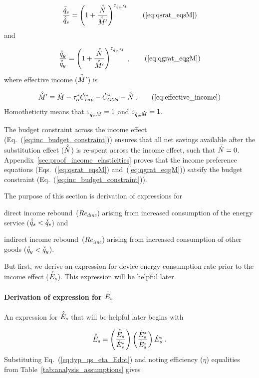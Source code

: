 \begin{equation}
  \incprefseqn \tag{\ref{eq:qsrat_eqsM}}
\end{equation}
%
and

\begin{equation}
  \incprefoeqn \; , \tag{\ref{eq:qgrat_eqgM}}
\end{equation}
%
where effective income ($\hat{\dot{M}}^\prime$) is

\begin{equation}
  \effinceqn{} \; . \tag{\ref{eq:effective_income}}
\end{equation}
%
Homotheticity means that $\varepsilon_{\dot{q}_s\!,\dot{M}} = 1$ and $\varepsilon_{\dot{q}_g\!,\dot{M}} = 1$.

The budget constraint across the income effect (Eq.~(\ref{eq:inc_budget_constraint}))
ensures that all net savings available after the substitution effect ($\hat{\dot{N}}$)
is re-spent across the income effect,
such that $\bar{\dot{N}} = 0$.
Appendix~\ref{sec:proof_income_elasticities} proves that
the income preference equations (Eqs.~(\ref{eq:qsrat_eqsM}) and~(\ref{eq:qgrat_eqgM}))
satsify the budget constraint (Eq.~(\ref{eq:inc_budget_constraint})).

The purpose of this section is derivation of expressions for
%
\begin{enumerate*}[label={(\roman*)}]

  \item direct income rebound~($Re_{dinc}$)
        arising from increased consumption of the energy service
        ($\hat{\dot{q}}_s < \bar{\dot{q}}_s$) and

  \item indirect income rebound~($Re_{iinc}$)
        arising from increased consumption of other goods
        ($\hat{\dot{q}}_g < \bar{\dot{q}}_g$).

\end{enumerate*}

But first, we derive an expression
for device energy consumption rate prior to the income effect
($\hat{\dot{E}}_s$).
This expression will be helpful later.

\paragraph{Derivation of expression for $\hat{\dot{E}}_s$}
\label{sec:E_dot_s_hat_expression}

An expression for $\hat{\dot{E}}_s$ that will be helpful later
begins with

\begin{equation}
  \hat{\dot{E}}_s = \left( \frac{\hat{\dot{E}}_s}{{\dot{E}}^*_s} \right)
                \left( \frac{{\dot{E}}^*_s}{{}{\dot{E}}^{\scriptscriptstyle \circ}_s} \right)
                {}{\dot{E}}^{\scriptscriptstyle \circ}_s \; .
\end{equation}
%
Substituting Eq.~(\ref{eq:typ_qs_eta_Edot}) and noting efficiency ($\eta$)
equalities from Table~\ref{tab:analysis_assumptions} gives

